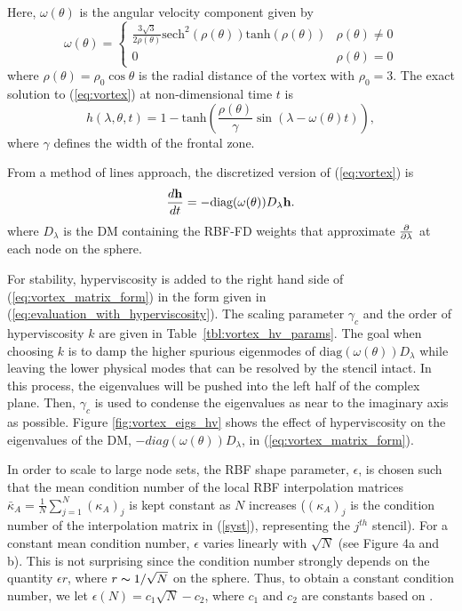 Here, $\omega(\theta)$ is the angular velocity component given by
\begin{equation*}
\omega(\theta) =
\begin{cases}
\frac{3\sqrt{3}}{2 \rho(\theta)} \mathrm{sech}^{2}(\rho(\theta)) \mathrm{tanh}(\rho(\theta)) & \rho(\theta) \neq 0 \\
0 & \rho(\theta) = 0
\end{cases}
\end{equation*}
where $\rho(\theta) = \rho_0 \cos \theta$ is the radial distance of the vortex with $\rho_0=3$. The exact solution to (\ref{eq:vortex}) at non-dimensional time $t$ is
\begin{equation*}
h(\lambda, \theta, t) = 1 - \mathrm{tanh}\left( \frac{\rho(\theta)}{\gamma} \sin(\lambda - \omega(\theta) t) \right),
\end{equation*}
where $\gamma$ defines the width of the frontal zone.

From a method of lines approach, the discretized version of (\ref{eq:vortex}) is
\begin{equation}
\frac{d \mathbf{h}}{d t} = - \text{diag}(\omega(\theta)) D_\lambda \mathbf{h}.
\label{eq:vortex_matrix_form}
\end{equation}
where $D_\lambda$ is the DM containing the RBF-FD weights that approximate $\frac{\partial }{\partial \lambda}$ at each node on the sphere.

For stability, hyperviscosity is added to the right hand side of (\ref{eq:vortex_matrix_form}) in the form given in (\ref{eq:evaluation_with_hyperviscosity}). The scaling parameter $\gamma_c$ and the order of hyperviscosity $k$ are given in
Table~\ref{tbl:vortex_hv_params}. The goal when choosing $k$ is to damp the higher spurious eigenmodes of $\text{diag}(\omega(\theta)) D_\lambda$ while leaving the lower physical modes that can be resolved by the stencil intact. In this process, the eigenvalues will be pushed into the left half of the complex plane. Then, $\gamma_c$ is used to condense the eigenvalues as near to the imaginary axis as possible. Figure \ref{fig:vortex_eigs_hv} shows the effect of hyperviscosity on the eigenvalues of the DM, $-diag(\omega(\theta)) D_\lambda$, in (\ref{eq:vortex_matrix_form}). 

In order to scale to large node sets, the RBF shape parameter, $\epsilon$, is chosen such that the mean condition number of the local RBF interpolation matrices $\bar{\kappa}_A = \frac{1}{N}\sum_{j=1}^N (\kappa_A)_j$ is kept constant as $N$ increases ($(\kappa_A)_j$ is the condition number of the interpolation matrix in (\ref{syst}), representing the $j^{th}$ stencil). For a constant mean condition number, $\epsilon$ varies linearly with $\sqrt{N}$ (see \cite{FlyerLehto11} Figure 4a and b). This is not surprising since the condition number strongly depends on the quantity $\epsilon r$, where $r\thicksim1/\sqrt{N}$ on the sphere. Thus, to obtain a constant condition number, we let $\epsilon (N) = c_1 \sqrt{N} - c_2$, where $c_1$ and $c_2$ are constants based on \cite{FlyerLehto11}.

